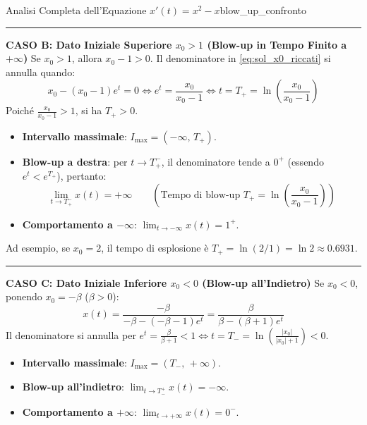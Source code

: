 \begin{esempio}{Analisi Completa dell'Equazione $x'(t) = x^2 - x$}{blow_up_confronto}
\rule{\textwidth}{0.4pt}

\noindent\textbf{CASO B: Dato Iniziale Superiore $x_0 > 1$ (Blow-up in Tempo Finito a $+\infty$)}
Se $x_0 > 1$, allora $x_0 - 1 > 0$. Il denominatore in \eqref{eq:sol_x0_riccati} si annulla quando:
\[
    x_0 - (x_0 - 1) e^t = 0 \iff e^t = \frac{x_0}{x_0 - 1} \iff t = T_+ = \ln\left( \frac{x_0}{x_0 - 1} \right)
\]
Poiché $\frac{x_0}{x_0 - 1} > 1$, si ha $T_+ > 0$.
\begin{itemize}
    \item \textbf{Intervallo massimale}: $I_{\text{max}} = (-\infty, \, T_+)$.
    \item \textbf{Blow-up a destra}: per $t \to T_+^-$, il denominatore tende a $0^+$ (essendo $e^t < e^{T_+}$), pertanto:
    \[
        \lim_{t \to T_+^-} x(t) = +\infty \qquad \left( \text{Tempo di blow-up } T_+ = \ln\left(\frac{x_0}{x_0-1}\right) \right)
    \]
    \item \textbf{Comportamento a $-\infty$}: $\lim_{t \to -\infty} x(t) = 1^+$.
\end{itemize}
Ad esempio, se $x_0 = 2$, il tempo di esplosione è $T_+ = \ln(2/1) = \ln 2 \approx 0.6931$.

\rule{\textwidth}{0.4pt}

\noindent\textbf{CASO C: Dato Iniziale Inferiore $x_0 < 0$ (Blow-up all'Indietro)}
Se $x_0 < 0$, ponendo $x_0 = -\beta$ ($\beta > 0$):
\[
    x(t) = \frac{-\beta}{-\beta - (-\beta - 1)e^t} = \frac{\beta}{\beta - (\beta+1)e^t}
\]
Il denominatore si annulla per $e^t = \frac{\beta}{\beta+1} < 1 \iff t = T_- = \ln\left(\frac{|x_0|}{|x_0|+1}\right) < 0$.
\begin{itemize}
    \item \textbf{Intervallo massimale}: $I_{\text{max}} = (T_-, \, +\infty)$.
    \item \textbf{Blow-up all'indietro}: $\lim_{t \to T_-^+} x(t) = -\infty$.
    \item \textbf{Comportamento a $+\infty$}: $\lim_{t \to +\infty} x(t) = 0^-$.
\end{itemize}
\end{esempio}

